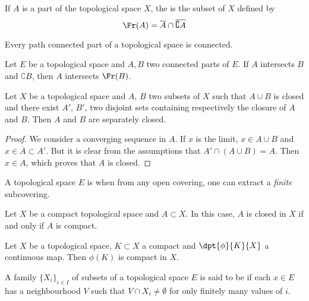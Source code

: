 If $A$ is a part of the topological space $X$, the  is the subset of $X$ defined by
\[
   \Fr(A)=\overline{A}\cap\overline{\complement A}
\]

\begin{lemma}
    Every path connected part of a topological space is connected.
\end{lemma}

\begin{theorem}
Let $E$ be a topological space and $A,B$ two connected parts of $E$. If $A$ intersects $B$ and $\complement B$, then $A$ intersects $\Fr(B)$.\label{tho:doine}
\end{theorem}


\begin{proposition}
Let $X$ be a topological space and $A$, $B$ two subsets of $X$ such that $A\cup B$ is closed and there exist $A'$, $B'$, two disjoint sets containing respectively the closure of $A$ and $B$. Then $A$ and $B$ are separately closed.\label{prop:sep_ferme}
\end{proposition}

\begin{proof}
We consider a converging sequence in $A$. If $x$ is the limit, $x\in A\cup B$ and $x\in\overline{A}\subset A'$. But it is clear from the assumptions that $A'\cap(A\cup B)=A$. Then $x\in A$, which proves that $A$ is closed.
\end{proof}

\begin{definition}
A topological space $E$ is  when from any open covering, one can extract a \emph{finite} subcovering. \label{def:compact}
\end{definition}

\begin{lemma}
Let $X$ be a compact topological space and $A\subset X$. In this case, $A$ is closed in $X$ if and only if $A$ is compact.
 \label{lem:ferme_compact}
\end{lemma}

\begin{proposition}
Let $X$ be a topological space, $K\subset X$ a compact and $\dpt{\phi}{K}{X}$ a continuous map. Then $\phi(K)$ is compact in $X$.
\end{proposition}

\begin{definition}
  A family $\{ X_i \}_{i\in I}$ of subsets of a topological space $E$ is said to be  if each $x\in E$ has a neighbourhood $V$ such that $V\cap X_i \neq \emptyset$ for only finitely many values of $i$.
\end{definition}


